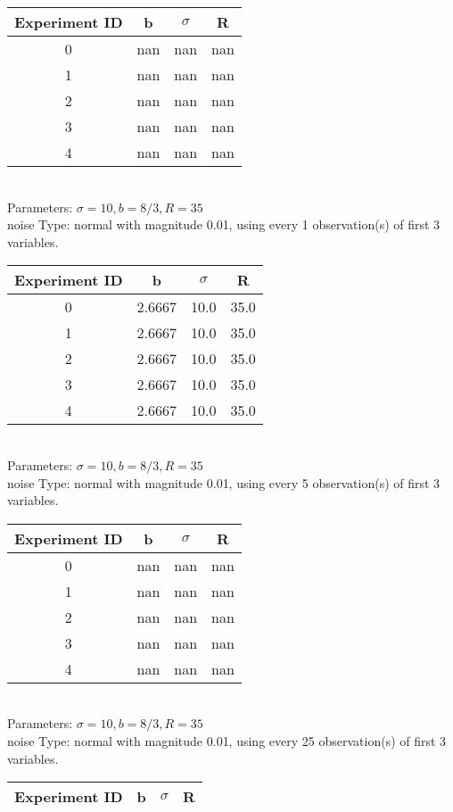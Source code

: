 \begin{multicols}{3}
\begin{tabular}{cccc}
\hline Experiment ID & b & $\sigma$ & R \\ \hline 
0 & nan & nan & nan\\ \hline 
 1 & nan & nan & nan\\ \hline 
 2 & nan & nan & nan\\ \hline 
 3 & nan & nan & nan\\ \hline 
 4 & nan & nan & nan\\ \hline 
 \end{tabular}\\
Parameters: $\sigma=10, b=8/3, R=35$\\
noise Type: normal with magnitude 0.01, using every 1 observation(s) of first 3 variables.\\
\begin{tabular}{cccc}
\hline Experiment ID & b & $\sigma$ & R \\ \hline 
0 & 2.6667 & 10.0 & 35.0\\ \hline 
 1 & 2.6667 & 10.0 & 35.0\\ \hline 
 2 & 2.6667 & 10.0 & 35.0\\ \hline 
 3 & 2.6667 & 10.0 & 35.0\\ \hline 
 4 & 2.6667 & 10.0 & 35.0\\ \hline 
 \end{tabular}\\
Parameters: $\sigma=10, b=8/3, R=35$\\
noise Type: normal with magnitude 0.01, using every 5 observation(s) of first 3 variables.\\
\begin{tabular}{cccc}
\hline Experiment ID & b & $\sigma$ & R \\ \hline 
0 & nan & nan & nan\\ \hline 
 1 & nan & nan & nan\\ \hline 
 2 & nan & nan & nan\\ \hline 
 3 & nan & nan & nan\\ \hline 
 4 & nan & nan & nan\\ \hline 
 \end{tabular}\\
Parameters: $\sigma=10, b=8/3, R=35$\\
noise Type: normal with magnitude 0.01, using every 25 observation(s) of first 3 variables.\\
\begin{tabular}{cccc}
\hline Experiment ID & b & $\sigma$ & R \\ \hline 

\end{tabular}
\end{multicols}
